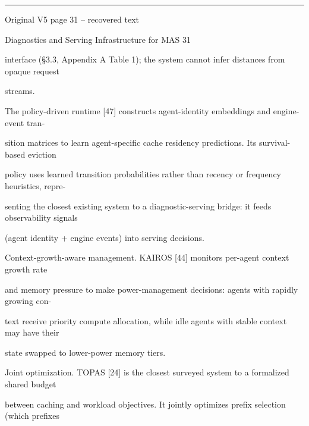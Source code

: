 \par\smallskip\noindent\rule{\textwidth}{0.4pt}\par{\sffamily\footnotesize Original V5 page 31 -- recovered text}\par\begin{flushleft}\footnotesize\ttfamily
\par\smallskip
\par\smallskip
\noindent Diagnostics and Serving Infrastructure for MAS 31\par
\par\smallskip
\par\smallskip
\par\smallskip
\noindent interface (§3.3, Appendix A Table 1); the system cannot infer distances from opaque request\par
\noindent streams.\par
\noindent  The policy-driven runtime [47] constructs agent-identity embeddings and engine-event tran-\par
\noindent sition matrices to learn agent-specific cache residency predictions. Its survival-based eviction\par
\noindent policy uses learned transition probabilities rather than recency or frequency heuristics, repre-\par
\noindent senting the closest existing system to a diagnostic-serving bridge: it feeds observability signals\par
\noindent (agent identity + engine events) into serving decisions.\par
\par\smallskip
\noindent Context-growth-aware management. KAIROS [44] monitors per-agent context growth rate\par
\noindent and memory pressure to make power-management decisions: agents with rapidly growing con-\par
\noindent text receive priority compute allocation, while idle agents with stable context may have their\par
\noindent state swapped to lower-power memory tiers.\par
\par\smallskip
\noindent Joint optimization. TOPAS [24] is the closest surveyed system to a formalized shared budget\par
\noindent between caching and workload objectives. It jointly optimizes prefix selection (which prefixes\par

\end{flushleft}
